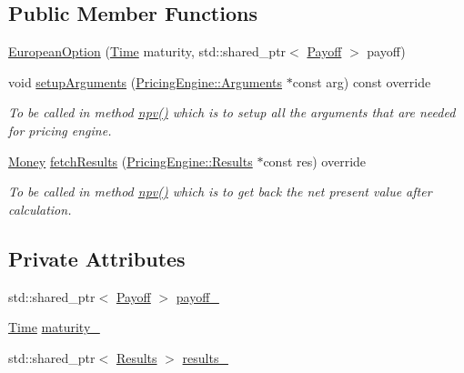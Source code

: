 \subsection*{Public Member Functions}
\begin{DoxyCompactItemize}
\item 
\hyperlink{class_european_option_a92132b61922cb628bc355d4d9f302513}{European\+Option} (\hyperlink{_name_def_8h_ac2d3e0ba793497bcca555c7c2cf64ff3}{Time} maturity, std\+::shared\+\_\+ptr$<$ \hyperlink{class_payoff}{Payoff} $>$ payoff)
\item 
void \hyperlink{class_european_option_a77e3bc17dbcf317561c4920f6bfa84de}{setup\+Arguments} (\hyperlink{class_pricing_engine_1_1_arguments}{Pricing\+Engine\+::\+Arguments} $\ast$const arg) const override
\begin{DoxyCompactList}\small\item\em To be called in method \hyperlink{class_instrument_aa750f2ae95a21d65a073da3171e8d084}{npv()} which is to setup all the arguments that are needed for pricing engine. \end{DoxyCompactList}\item 
\hyperlink{_name_def_8h_a5a9d48c16a694e9a2d9f1eca730dc8c5}{Money} \hyperlink{class_european_option_ae234d562ef21dc24c25f1538860da1cf}{fetch\+Results} (\hyperlink{class_pricing_engine_1_1_results}{Pricing\+Engine\+::\+Results} $\ast$const res) override
\begin{DoxyCompactList}\small\item\em To be called in method \hyperlink{class_instrument_aa750f2ae95a21d65a073da3171e8d084}{npv()} which is to get back the net present value after calculation. \end{DoxyCompactList}\end{DoxyCompactItemize}
\subsection*{Private Attributes}
\begin{DoxyCompactItemize}
\item 
std\+::shared\+\_\+ptr$<$ \hyperlink{class_payoff}{Payoff} $>$ \hyperlink{class_european_option_a3d597cb0b811f69a08e49b1af13b5a04}{payoff\+\_\+}
\item 
\hyperlink{_name_def_8h_ac2d3e0ba793497bcca555c7c2cf64ff3}{Time} \hyperlink{class_european_option_a8853b9bd1af9abc371630ae1c68f304c}{maturity\+\_\+}
\item 
std\+::shared\+\_\+ptr$<$ \hyperlink{class_european_option_1_1_results}{Results} $>$ \hyperlink{class_european_option_a228f13a5ce4c46caef1e3052b4a27610}{results\+\_\+}
\end{DoxyCompactItemize}
